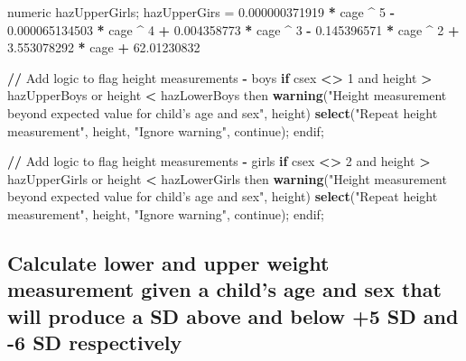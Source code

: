 \documentclass[12pt,a4paper]{article}
\newenvironment{Shaded}{\begin{snugshade}}{\end{snugshade}}
\newcommand{\KeywordTok}[1]{\textcolor[rgb]{0.13,0.29,0.53}{\textbf{#1}}}
\newcommand{\DecValTok}[1]{\textcolor[rgb]{0.00,0.00,0.81}{#1}}
\newcommand{\FloatTok}[1]{\textcolor[rgb]{0.00,0.00,0.81}{#1}}
\newcommand{\StringTok}[1]{\textcolor[rgb]{0.31,0.60,0.02}{#1}}
\newcommand{\ControlFlowTok}[1]{\textcolor[rgb]{0.13,0.29,0.53}{\textbf{#1}}}
\newcommand{\OperatorTok}[1]{\textcolor[rgb]{0.81,0.36,0.00}{\textbf{#1}}}
\newcommand{\ErrorTok}[1]{\textcolor[rgb]{0.64,0.00,0.00}{\textbf{#1}}}
\newcommand{\NormalTok}[1]{#1}
\theoremstyle{definition}
\theoremstyle{definition}
\theoremstyle{definition}
\theoremstyle{remark}
\begin{document}
\begin{Shaded}
\begin{Highlighting}[]
\NormalTok{numeric hazUpperGirls;}
\NormalTok{hazUpperGirs =}\StringTok{ }\FloatTok{0.000000371919} \OperatorTok{*}\StringTok{ }\NormalTok{cage }\OperatorTok{^}\StringTok{ }\DecValTok{5} \OperatorTok{-}\StringTok{ }\FloatTok{0.000065134503} \OperatorTok{*}\StringTok{ }\NormalTok{cage }\OperatorTok{^}\StringTok{ }\DecValTok{4}
               \OperatorTok{+}\StringTok{ }\FloatTok{0.004358773} \OperatorTok{*}\StringTok{ }\NormalTok{cage }\OperatorTok{^}\StringTok{ }\DecValTok{3} \OperatorTok{-}\StringTok{ }\FloatTok{0.145396571} \OperatorTok{*}\StringTok{ }\NormalTok{cage }\OperatorTok{^}\StringTok{ }\DecValTok{2}
               \OperatorTok{+}\StringTok{ }\FloatTok{3.553078292} \OperatorTok{*}\StringTok{ }\NormalTok{cage }\OperatorTok{+}\StringTok{ }\FloatTok{62.01230832}
               
\OperatorTok{/}\ErrorTok{/}\StringTok{ }\NormalTok{Add logic to flag height measurements }\OperatorTok{-}\StringTok{ }\NormalTok{boys}
\ControlFlowTok{if}\NormalTok{ csex }\OperatorTok{<}\ErrorTok{>}\StringTok{ }\DecValTok{1}\NormalTok{ and height }\OperatorTok{>}\StringTok{ }\NormalTok{hazUpperBoys or height }\OperatorTok{<}\StringTok{ }\NormalTok{hazLowerBoys then}
  \KeywordTok{warning}\NormalTok{(}\StringTok{"Height measurement beyond expected value for child's age and sex"}\NormalTok{,}
\NormalTok{          height)}
          \KeywordTok{select}\NormalTok{(}\StringTok{"Repeat height measurement"}\NormalTok{, height,}
                 \StringTok{"Ignore warning"}\NormalTok{, continue);}
\NormalTok{endif;}

\OperatorTok{/}\ErrorTok{/}\StringTok{ }\NormalTok{Add logic to flag height measurements }\OperatorTok{-}\StringTok{ }\NormalTok{girls}
\ControlFlowTok{if}\NormalTok{ csex }\OperatorTok{<}\ErrorTok{>}\StringTok{ }\DecValTok{2}\NormalTok{ and height }\OperatorTok{>}\StringTok{ }\NormalTok{hazUpperGirls or height }\OperatorTok{<}\StringTok{ }\NormalTok{hazLowerGirls then}
  \KeywordTok{warning}\NormalTok{(}\StringTok{"Height measurement beyond expected value for child's age and sex"}\NormalTok{,}
\NormalTok{          height)}
          \KeywordTok{select}\NormalTok{(}\StringTok{"Repeat height measurement"}\NormalTok{, height,}
                 \StringTok{"Ignore warning"}\NormalTok{, continue);}
\NormalTok{endif;}
\end{Highlighting}
\end{Shaded}

\newpage

\hypertarget{calculate-lower-and-upper-weight-measurement-given-a-childs-age-and-sex-that-will-produce-a-sd-above-and-below-5-sd-and--6-sd-respectively}{%
\subsection{Calculate lower and upper weight measurement given a child's
age and sex that will produce a SD above and below +5 SD and -6 SD
respectively}\label{calculate-lower-and-upper-weight-measurement-given-a-childs-age-and-sex-that-will-produce-a-sd-above-and-below-5-sd-and--6-sd-respectively}}
\end{document}
